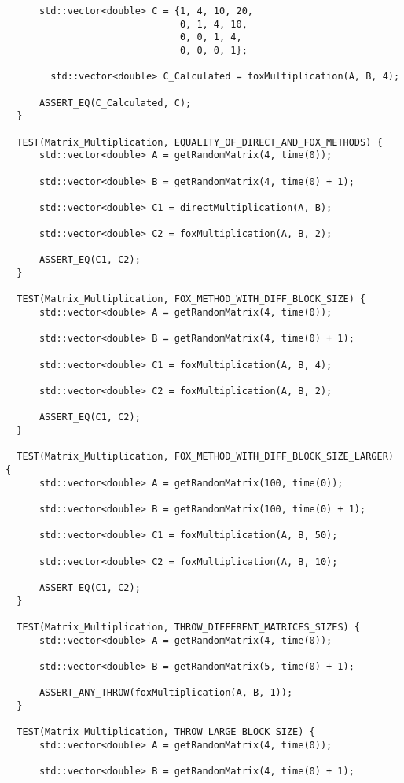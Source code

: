 \documentclass{article}
\begin{document}
\begin{lstlisting}
      std::vector<double> C = {1, 4, 10, 20,
                               0, 1, 4, 10,
                               0, 0, 1, 4,
                               0, 0, 0, 1};

        std::vector<double> C_Calculated = foxMultiplication(A, B, 4);

      ASSERT_EQ(C_Calculated, C);
  }

  TEST(Matrix_Multiplication, EQUALITY_OF_DIRECT_AND_FOX_METHODS) {
      std::vector<double> A = getRandomMatrix(4, time(0));

      std::vector<double> B = getRandomMatrix(4, time(0) + 1);

      std::vector<double> C1 = directMultiplication(A, B);

      std::vector<double> C2 = foxMultiplication(A, B, 2);

      ASSERT_EQ(C1, C2);
  }

  TEST(Matrix_Multiplication, FOX_METHOD_WITH_DIFF_BLOCK_SIZE) {
      std::vector<double> A = getRandomMatrix(4, time(0));

      std::vector<double> B = getRandomMatrix(4, time(0) + 1);

      std::vector<double> C1 = foxMultiplication(A, B, 4);

      std::vector<double> C2 = foxMultiplication(A, B, 2);

      ASSERT_EQ(C1, C2);
  }

  TEST(Matrix_Multiplication, FOX_METHOD_WITH_DIFF_BLOCK_SIZE_LARGER) {
      std::vector<double> A = getRandomMatrix(100, time(0));

      std::vector<double> B = getRandomMatrix(100, time(0) + 1);

      std::vector<double> C1 = foxMultiplication(A, B, 50);

      std::vector<double> C2 = foxMultiplication(A, B, 10);

      ASSERT_EQ(C1, C2);
  }

  TEST(Matrix_Multiplication, THROW_DIFFERENT_MATRICES_SIZES) {
      std::vector<double> A = getRandomMatrix(4, time(0));

      std::vector<double> B = getRandomMatrix(5, time(0) + 1);

      ASSERT_ANY_THROW(foxMultiplication(A, B, 1));
  }

  TEST(Matrix_Multiplication, THROW_LARGE_BLOCK_SIZE) {
      std::vector<double> A = getRandomMatrix(4, time(0));

      std::vector<double> B = getRandomMatrix(4, time(0) + 1);


\end{lstlisting}
\end{document}

